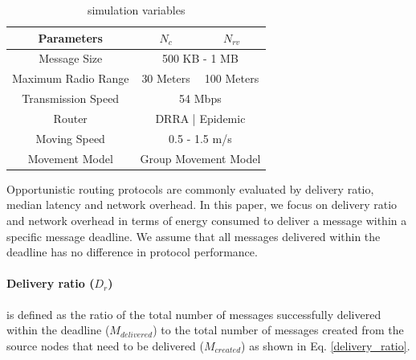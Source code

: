 \documentclass[conference]{IEEEtran}
\begin{document}
\begin{table}[!t]
	\renewcommand{\arraystretch}{1.3}
	\caption{simulation variables}
	\label{table_parameters}
	\centering
	\begin{tabular}{|c|c|c|}
		\hline
		Parameters         &  $N_{c}$ & $N_{rv}$ \\ \hline
		Message Size       &  \multicolumn{2}{|c|}{500 KB - 1 MB}        \\ \hline
		Maximum Radio Range & 30 Meters  & 100 Meters \\ \hline
		Transmission Speed &  \multicolumn{2}{|c|}{ 54 Mbps   }        \\ \hline
		Router             & \multicolumn{2}{|c|}{ DRRA | Epidemic   } \\ \hline
		Moving Speed       &   \multicolumn{2}{|c|}{0.5 - 1.5 m/s }        \\ \hline
		Movement Model     &   \multicolumn{2}{|c|}{Group Movement Model  }      \\ \hline
	\end{tabular}
\end{table}

Opportunistic routing protocols are commonly evaluated by delivery ratio, median latency and network overhead.
In this paper, we focus on delivery ratio and network overhead in terms of energy consumed to deliver a message within a specific message deadline.
We assume that all messages delivered within the deadline has no difference in protocol performance.


\paragraph{Delivery ratio ($D_{r}$)} 
is defined as the ratio of the total number of messages successfully delivered within the deadline ($ { M }_{ delivered }$) to the total number of messages created from the source nodes that need to be delivered ($ { M }_{ created }$) as shown in Eq. \ref{delivery_ratio}.
\end{document}

